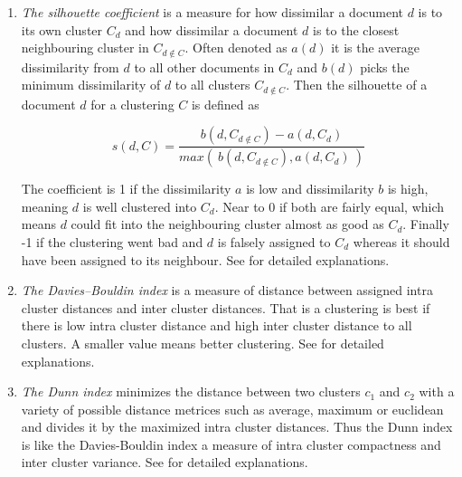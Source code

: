       \begin{enumerate}
        \item \emph{The silhouette coefficient} is a measure for how dissimilar a document $d$ is to its own cluster $C_d$ and how dissimilar a document $d$ is to the closest neighbouring cluster in $C_{d \not \in C}$. Often denoted as $a(d)$ it is the average dissimilarity from $d$ to all other documents in $C_d$ and $b(d)$ picks the minimum dissimilarity of $d$ to all clusters $C_{d \not \in C}$. Then the silhouette of a document $d$ for a clustering $C$ is defined as

          \begin{equation}
            s(d, C) = \frac{b(d, C_{d \not \in C}) - a(d, C_d)}{max(\:b(d, C_{d \not \in C}), a(d, C_d)\:)}
          \end{equation} 

        The coefficient is 1 if the dissimilarity $a$ is low and dissimilarity $b$ is high, meaning $d$ is well clustered into $C_d$. Near to 0 if both are fairly equal, which means $d$ could fit into the neighbouring cluster almost as good as $C_d$. Finally -1 if the clustering went bad and $d$ is falsely assigned to $C_d$ whereas it should have been assigned to its neighbour. See \cite{Silhouettes1987} for detailed explanations.

        \item \emph{The Davies–Bouldin index} is a measure of distance between assigned intra cluster distances and inter cluster distances. That is a clustering is best if there is low intra cluster distance and high inter cluster distance to all clusters. A smaller value means better clustering. See \cite{DavisBouldin1979} for detailed explanations. 

        \item \emph{The Dunn index} minimizes the distance between two clusters $c_1$ and $c_2$ with a variety of possible distance metrices such as average, maximum or euclidean and divides it by the maximized intra cluster distances. Thus the Dunn index is like the Davies-Bouldin index a measure of intra cluster compactness and inter cluster variance. See \cite{DunnIndex1973} for detailed explanations. 
      \end{enumerate}

